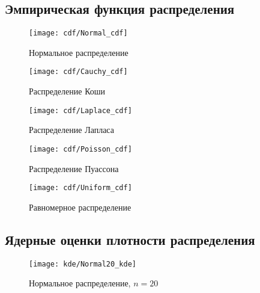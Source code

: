\subsection{Эмпирическая функция распределения}

\begin{figure}[H]
	\begin{center}
		\texttt{[image: cdf/Normal\_cdf]}
		\caption{Нормальное распределение} 
		\label{pic:pic_name} 
	\end{center}
\end{figure}

\begin{figure}[H]
	\begin{center}
		\texttt{[image: cdf/Cauchy\_cdf]}
		\caption{Распределение Коши} 
		\label{pic:pic_name} 
	\end{center}
\end{figure}

\begin{figure}[H]
	\begin{center}
		\texttt{[image: cdf/Laplace\_cdf]}
		\caption{Распределение Лапласа} 
		\label{pic:pic_name} 
	\end{center}
\end{figure}

\begin{figure}[H]
	\begin{center}
		\texttt{[image: cdf/Poisson\_cdf]}
		\caption{Распределение Пуассона} 
		\label{pic:pic_name} 
	\end{center}
\end{figure}

\begin{figure}[H]
	\begin{center}
		\texttt{[image: cdf/Uniform\_cdf]}
		\caption{Равномерное распределение} 
		\label{pic:pic_name} 
	\end{center}
\end{figure}


\subsection{Ядерные оценки плотности распределения}

\begin{figure}[H]
	\begin{center}
		\texttt{[image: kde/Normal20\_kde]}
		\caption{Нормальное распределение, $n=20$} 
		\label{pic:pic_name} 
	\end{center}
\end{figure}

